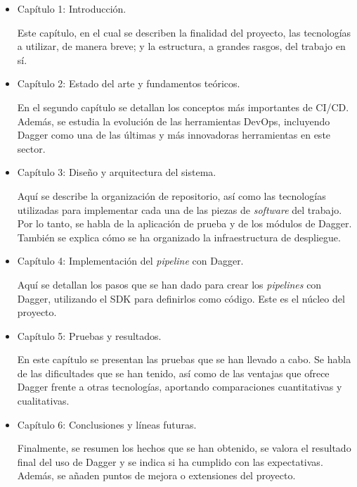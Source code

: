 \begin{itemize}
  \item Capítulo 1: Introducción.

    Este capítulo, en el cual se describen la finalidad del proyecto, las tecnologías a utilizar, de manera breve; y la estructura, a grandes rasgos, del trabajo en sí.

  \item Capítulo 2: Estado del arte y fundamentos teóricos.

    En el segundo capítulo se detallan los conceptos más importantes de CI/CD. Además, se estudia la evolución de las herramientas DevOps\cite{devops}, incluyendo Dagger como una de las últimas y más innovadoras herramientas en este sector.
  \item Capítulo 3: Diseño y arquitectura del sistema.

    Aquí se describe la organización de repositorio, así como las tecnologías utilizadas para implementar cada una de las piezas de \textit{software} del trabajo. Por lo tanto, se habla de la aplicación de prueba y de los módulos de Dagger. También se explica cómo se ha organizado la infraestructura de despliegue.
  \item Capítulo 4: Implementación del \textit{pipeline} con Dagger.

    Aquí se detallan los pasos que se han dado para crear los \textit{pipelines} con Dagger, utilizando el SDK para definirlos como código. Este es el núcleo del proyecto.
  \item Capítulo 5: Pruebas y resultados.

    En este capítulo se presentan las pruebas que se han llevado a cabo. Se habla de las dificultades que se han tenido, así como de las ventajas que ofrece Dagger frente a otras tecnologías, aportando comparaciones cuantitativas y cualitativas.
  \item Capítulo 6: Conclusiones y líneas futuras.

    Finalmente, se resumen los hechos que se han obtenido, se valora el resultado final del uso de Dagger y se indica si ha cumplido con las expectativas. Además, se añaden puntos de mejora o extensiones del proyecto.
\end{itemize}
